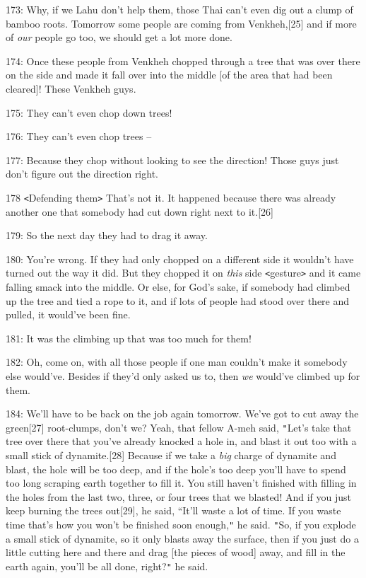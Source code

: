{173: Why, if we Lahu don't help them, those Thai can't even dig out a clump
of bamboo roots. Tomorrow some people are coming from Venkheh,[25] and if more
of }{\textit{our}}{ people go too, we should get a lot more done.
}

{174: Once these people from Venkheh chopped through a tree that was over
there on the side and made it fall over into the middle [of the area that had been
cleared]! These Venkheh guys. }

{175: They can't even chop down trees!}

{176: They can't even chop trees --}

{177: Because they chop without looking to see the direction! Those guys
just don't figure out the direction right.}

{178 \texttt{<}Defending them\texttt{>} That's not it. It happened because
there was already another one that somebody had cut down right next to it.[26]}

{179: So the next day they had to drag it away. }

{180: You're wrong. If they had only chopped on a different side it wouldn't
have turned out the way it did. But they chopped it on }{\textit{this}}{
side \texttt{<}gesture\texttt{>} and it came falling smack into the middle. Or
else, for God's sake, if somebody had climbed up the tree and tied a rope to it,
and if lots of people had stood over there and pulled, it would've been fine. }

{181: It was the climbing up that was too much for them!}

{182: Oh, come on, with all those people if one man couldn't make it somebody
else would've. Besides if they'd only asked us to, then }{\textit{we}}{
would've climbed up for them.}

{184: We'll have to be back on the job again tomorrow. We've got to cut
away the green[27] root-clumps, don't we? Yeah, that fellow A-meh said, \texttt{"}Let's
take that tree over there that you've already knocked a hole in, and blast it out
too with a small stick of dynamite.[28] Because if we take a }{\textit{big}}{
charge of dynamite and blast, the hole will be too deep, and if the hole's too
deep you'll have to spend too long scraping earth together to fill it. You still
haven't finished with filling in the holes from the last two, three, or four trees
that we blasted! And if you just keep burning the trees out[29], he said, ``It'll
waste a lot of time. If you waste time that's how you won't be finished soon enough,\texttt{"}
he said. \texttt{"}So, if you explode a small stick of dynamite, so it only blasts
away the surface, then if you just do a little cutting here and there and drag
[the pieces of wood] away, and fill in the earth again, you'll be all done, right?\texttt{"}
he said. }

